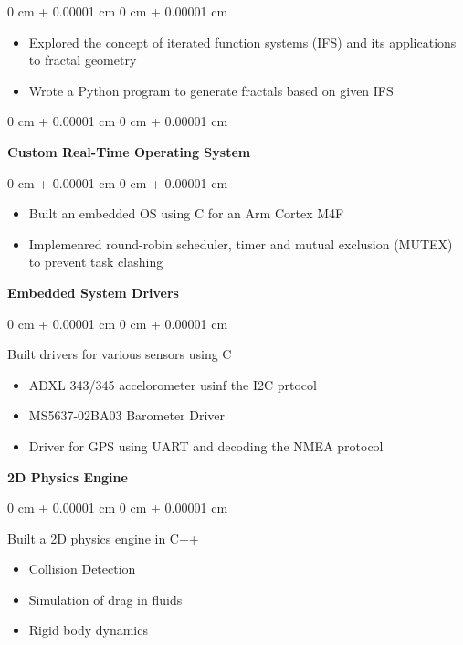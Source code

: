 \documentclass[10pt, letterpaper]{article}
\newenvironment{onecolentry}{
    \begin{adjustwidth}{
        0 cm + 0.00001 cm
    }{
        0 cm + 0.00001 cm
    }
}{
    \end{adjustwidth}
} %
\newenvironment{twocolentry}[2][]{
    \onecolentry
    \def\secondColumn{#2}
    \setcolumnwidth{\fill, 4.5 cm}
    \begin{paracol}{2}
}{
    \switchcolumn \raggedleft \secondColumn
    \end{paracol}
    \endonecolentry
} %
\begin{document}
        \vspace{0.10 cm}
        \begin{onecolentry}
            \begin{itemize}
                \item Explored the concept of iterated function systems (IFS) and its applications to fractal geometry 
                \item Wrote a Python program to generate fractals based on given IFS
            \end{itemize}
        \end{onecolentry}


        \vspace{0.2 cm}

        \begin{twocolentry}{}
            \textbf{Custom Real-Time Operating System}
        \end{twocolentry}

        \vspace{0.10 cm}
        \begin{onecolentry}
            \begin{itemize}
                \item Built an embedded OS using C for an Arm Cortex M4F 
                \item Implemenred round-robin scheduler, timer and mutual exclusion (MUTEX) to prevent task clashing
            \end{itemize}
        \end{onecolentry}

        \vspace{0.20cm}
        
    \textbf{Embedded System Drivers}
        \vspace{0.10 cm}
        \begin{onecolentry}
         Built drivers for various sensors using C
            \begin{itemize}
                \item ADXL 343/345 accelorometer usinf the I2C prtocol
                \item MS5637-02BA03 Barometer Driver
                \item Driver for GPS using UART and decoding the NMEA protocol
            \end{itemize}
        \end{onecolentry}

    \textbf{2D Physics Engine}
        \vspace{0.10 cm}
        \begin{onecolentry}
         Built a 2D physics engine in C++
            \begin{itemize}
                \item Collision Detection
                \item Simulation of drag in fluids
                \item Rigid body dynamics
            \end{itemize}
        \end{onecolentry}
\end{document}
